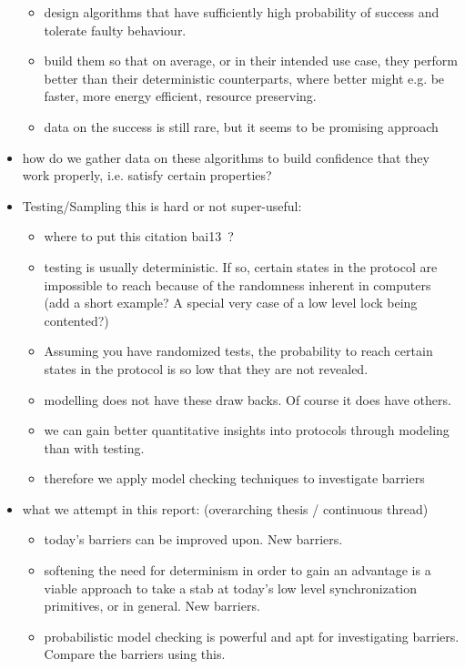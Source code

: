 \documentclass[a4paper, 10pt]{article}
\begin{document}
\begin{itemize}
\begin{itemize}
			\item design algorithms that have sufficiently high probability of success and tolerate faulty behaviour.
			\item build them so that on average, or in their intended use case, they perform better than their deterministic counterparts, where better might e.g. be faster, more energy efficient, resource preserving.
			\item data on the success is still rare, but it seems to be promising approach
		\end{itemize}
	\item how do we gather data on these algorithms to build confidence that they work properly, i.e. satisfy certain properties?
	\item Testing/Sampling this is hard or not super-useful:
		\begin{itemize}
			\item where to put this citation bai13~\cite{bai13}?
			\item testing is usually deterministic. If so, certain states in the protocol are impossible to reach because of the randomness inherent in computers (add a short example? A special very case of a low level lock being contented?)
			\item Assuming you have randomized tests, the probability to reach certain states in the protocol is so low that they are not revealed.
			\item modelling does not have these draw backs. Of course it does have others.
			\item we can gain better quantitative insights into protocols through modeling than with testing.
			\item therefore we apply model checking techniques to investigate barriers
		\end{itemize}
	\item what we attempt in this report: (overarching thesis / continuous thread)
		\begin{itemize}
			\item today's barriers can be improved upon. New barriers.
			\item softening the need for determinism in order to gain an advantage is a viable approach to take a stab at today's low level synchronization primitives, or in general. New barriers.
			\item probabilistic model checking is powerful and apt for investigating barriers. Compare the barriers using this.
		\end{itemize}

\end{itemize}
\end{document}
